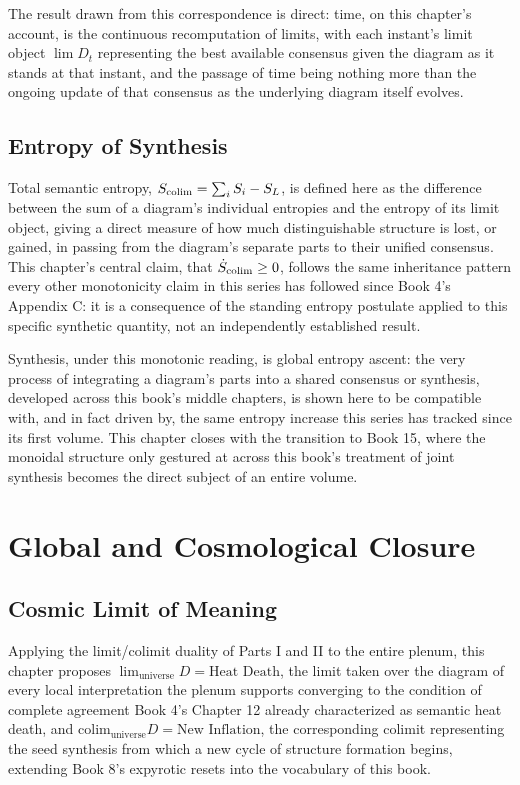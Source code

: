 The result drawn from this correspondence is direct: time, on this chapter's account, is the continuous recomputation of limits, with each instant's limit object $\lim D_t$ representing the best available consensus given the diagram as it stands at that instant, and the passage of time being nothing more than the ongoing update of that consensus as the underlying diagram itself evolves.

\chapter{Entropy of Synthesis}

Total semantic entropy, $S_{\text{colim}} = \sum_i S_i - S_L$, is defined here as the difference between the sum of a diagram's individual entropies and the entropy of its limit object, giving a direct measure of how much distinguishable structure is lost, or gained, in passing from the diagram's separate parts to their unified consensus. This chapter's central claim, that $\dot{S}_{\text{colim}} \geq 0$, follows the same inheritance pattern every other monotonicity claim in this series has followed since Book 4's Appendix C: it is a consequence of the standing entropy postulate applied to this specific synthetic quantity, not an independently established result.

Synthesis, under this monotonic reading, is global entropy ascent: the very process of integrating a diagram's parts into a shared consensus or synthesis, developed across this book's middle chapters, is shown here to be compatible with, and in fact driven by, the same entropy increase this series has tracked since its first volume. This chapter closes with the transition to Book 15, where the monoidal structure only gestured at across this book's treatment of joint synthesis becomes the direct subject of an entire volume.

\part{Global and Cosmological Closure}

\chapter{Cosmic Limit of Meaning}

Applying the limit/colimit duality of Parts I and II to the entire plenum, this chapter proposes $\lim_{\text{universe}} D = \text{Heat Death}$, the limit taken over the diagram of every local interpretation the plenum supports converging to the condition of complete agreement Book 4's Chapter 12 already characterized as semantic heat death, and $\mathrm{colim}_{\text{universe}} D = \text{New Inflation}$, the corresponding colimit representing the seed synthesis from which a new cycle of structure formation begins, extending Book 8's expyrotic resets into the vocabulary of this book.

